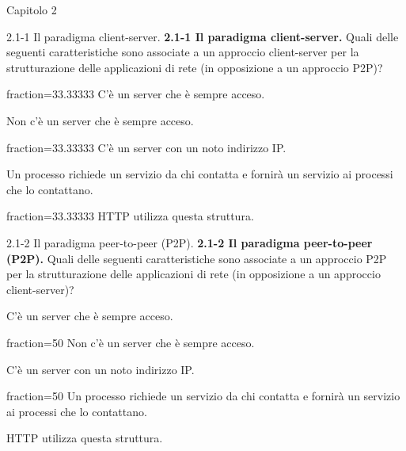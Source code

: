 \documentclass[11pt]{article}
\begin{document}
\begin{quiz}{Capitolo 2}

\begin{multi}[points=1,shuffle,multiple,]{2.1-1 Il paradigma client-server.}
\textbf{2.1-1 Il paradigma client-server.} Quali delle seguenti caratteristiche sono associate a un approccio client-server per la strutturazione delle applicazioni di rete (in opposizione a un approccio P2P)?
\item[fraction=33.33333] C'è un server che è sempre acceso.
\item Non c'è un server che è sempre acceso.
\item[fraction=33.33333] C'è un server con un noto indirizzo IP.
\item Un processo richiede un servizio da chi contatta e fornirà un servizio ai processi che lo contattano.
\item[fraction=33.33333] HTTP utilizza questa struttura.
\end{multi}

\begin{multi}[points=1,shuffle,multiple]{2.1-2 Il paradigma peer-to-peer (P2P).}
\textbf{2.1-2 Il paradigma peer-to-peer (P2P).} Quali delle seguenti caratteristiche sono associate a un approccio P2P per la strutturazione delle applicazioni di rete (in opposizione a un approccio client-server)?
\item C'è un server che è sempre acceso.
\item[fraction=50] Non c'è un server che è sempre acceso.
\item C'è un server con un noto indirizzo IP.
\item[fraction=50] Un processo richiede un servizio da chi contatta e fornirà un servizio ai processi che lo contattano.
\item HTTP utilizza questa struttura.
\end{multi}


\end{quiz}
\end{document}
